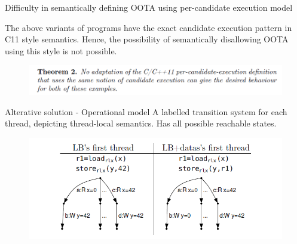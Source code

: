 \documentclass{beamer}
\begin{document}
    \begin{frame}{Difficulty in semantically defining OOTA using per-candidate execution model}
        
        The above variants of programs have the exact candidate execution pattern in C11 style semantics.
        Hence, the possibility of semantically disallowing OOTA using this style is not possible. 
        
        \begin{figure}
            \centering
            \includegraphics[scale=0.6]{OOTA-Thm.PNG}
        \end{figure}

    \end{frame}

    \begin{frame}{Alterative solution - Operational model}
        A labelled transition system for each thread, depicting thread-local semantics.
        Has all possible reachable states. 

        \begin{figure}
            \centering
            \includegraphics[scale=0.7]{Out-of-order-Oper.PNG}
        \end{figure}

    \end{frame}
\end{document}
